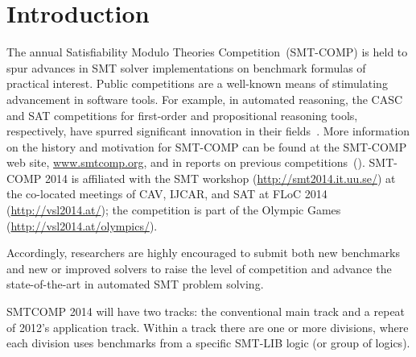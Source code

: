 \documentclass[12pt]{article}
\begin{document}
\section{Introduction}
\label{sec:intro}

The annual Satisfiability Modulo Theories Competition~(SMT-COMP) is
held to spur advances in SMT solver implementations on benchmark
formulas of practical interest.  Public competitions are a well-known
means of stimulating advancement in software tools.  For example, in
automated reasoning, the CASC and SAT competitions for first-order and
propositional reasoning tools, respectively, have spurred significant
innovation in their fields~\cite{PSS02,leberre+03}.  More information
on the history and motivation for SMT-COMP can be found at the
SMT-COMP web site, \url{www.smtcomp.org}, and in reports on previous
competitions~(\cite{SMTCOMP-2008,BDOS08,SMTCOMP-FMSD,SMTCOMP-JAR,TBD-2012,TBD-2013}).
SMT-COMP 2014 is affiliated with the SMT workshop (\url {http://smt2014.it.uu.se/}) at the co-located meetings of CAV, IJCAR, and SAT at FLoC 2014 (\url{http://vsl2014.at/}); the competition is part of the
Olympic Games (\url{http://vsl2014.at/olympics/}).

Accordingly, researchers are highly encouraged to submit both new benchmarks
and new or improved solvers to raise the level of competition and advance
the state-of-the-art in automated SMT problem solving.

SMTCOMP 2014 will have two tracks: the conventional main track and a repeat of 2012's application track.
Within a track there are one or more divisions, where each division
uses benchmarks from a specific SMT-LIB logic (or group of logics).
\end{document}
